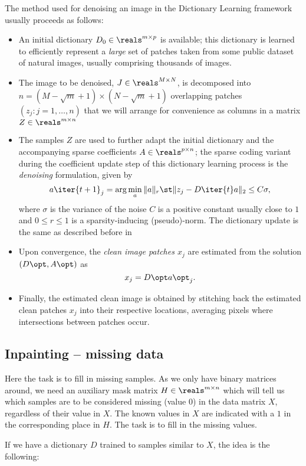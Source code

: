 \documentclass[a4paper,11pt]{article}
\begin{document}
The method used for denoising an image in the Dictionary Learning framework usually proceeds as follows:
\begin{itemize}
\item An initial dictionary $D_0 \in \reals^{m{\times}p}$ is available; this dictionary is learned to efficiently represent a \emph{large} set of patches taken from some public dataset of natural images, usually comprising thousands of images.
\item The image to be denoised, $J \in \reals^{M{\times}N}$, is decomposed into $n=(M-\sqrt{m}+1){\times}(N-\sqrt{m}+1)$ overlapping patches $(z_j : j = 1,\ldots,n)$ that we will arrange for convenience as columns in a matrix $Z \in \reals^{m{\times}n}$
\item The samples $Z$ are used to further adapt the initial dictionary and the accompanying sparse coefficients $A \in \reals^{p{\times}n}$; the sparse coding variant during the coefficient update step of this dictionary learning process is the \emph{denoising} formulation, given by
\[
a\iter{t+1}_j = \arg\min_a \|a\|_r \st \|z_j - D\iter{t}a \|_2 \leq C\sigma, 
\]
where $\sigma$ is the variance of the noise $C$ is a positive constant usually close to $1$ and $0 \leq r \leq 1$ is a sparsity-inducing (pseudo)-norm. The dictionary update is the same as described before in 
\item Upon convergence, the \emph{clean image patches $x_j$} are estimated from the solution $(D\opt,A\opt)$ as $$x_j = D\opt a\opt_j.$$
\item Finally, the estimated clean image is obtained by stitching back the estimated clean patches $x_j$ into their respective locations, averaging pixels where intersections between patches occur.
\end{itemize}

\subsection{Inpainting -- missing data}

Here the task is to fill in missing samples. As we only have binary matrices around, we need an auxiliary mask matrix $H \in \reals^{m{\times}n}$ which will tell us which samples are to be considered missing (value $0$) in the data matrix $X$, regardless of their value in $X$. The known values in $X$ are indicated with a $1$ in the corresponding place in $H$. The task is to fill in the missing values.

If we have a dictionary $D$ trained to samples similar to $X$, the idea is the following:
\end{document}
